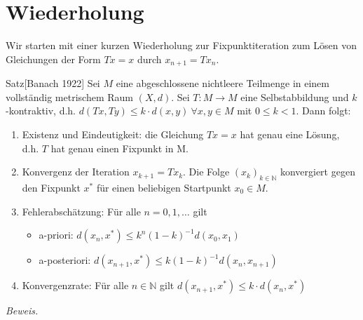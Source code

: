 \section{Wiederholung}
Wir starten mit einer kurzen Wiederholung zur Fixpunktiteration zum Lösen von Gleichungen 
der Form $Tx=x$ durch $x_{n+1}=Tx_n$.

\begin{thmbox}{Satz}[Banach 1922]
    Sei $M$ eine abgeschlossene nichtleere Teilmenge in einem vollständig metrischem Raum $(X,d)$. 
    Sei $T:M\rightarrow M$ eine Selbstabbildung und $k$-kontraktiv, d.h. $d(Tx,Ty)\leq k\cdot d(x,y)\ \forall x,y\in M$ 
    mit $0\leq k < 1$. Dann folgt:
    \begin{enumerate}
        \item Existenz und Eindeutigkeit: die Gleichung $Tx=x$ hat genau eine Lösung, d.h. $T$ hat genau einen 
        Fixpunkt in M.
        \item Konvergenz der Iteration $x_{k+1}=Tx_k$. Die Folge $(x_k)_{k\in\mathbb{N}}$ konvergiert gegen den 
        Fixpunkt $x^*$ für einen beliebigen Startpunkt $x_0\in M$.
        \item Fehlerabschätzung: Für alle $n=0,1,\dotsc$ gilt 
        \begin{itemize}
            \item a-priori: $d(x_n,x^*)\leq k^n(1-k)^{-1}d(x_0,x_1)$
            \item a-posteriori: $d(x_{n+1},x^*)\leq k(1-k)^{-1}d(x_n,x_{n+1})$
        \end{itemize}
        \item Konvergenzrate: Für alle $n\in\mathbb{N}$ gilt $d(x_{n+1},x^*)\leq k\cdot d(x_n,x^*)$
    \end{enumerate}
\end{thmbox}
\textit{Beweis.} 
